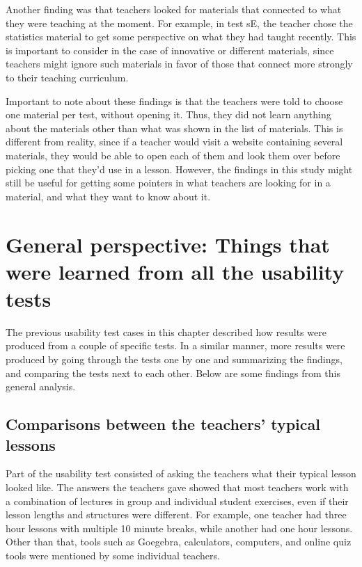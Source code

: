 Another finding was that teachers looked for materials that connected to what they were teaching at the moment. For example, in test sE, the teacher chose the statistics material to get some perspective on what they had taught recently. This is important to consider in the case of innovative or different materials, since teachers might ignore such materials in favor of those that connect more strongly to their teaching curriculum.

Important to note about these findings is that the teachers were told to choose one material per test, without opening it. Thus, they did not learn anything about the materials other than what was shown in the list of materials. This is different from reality, since if a teacher would visit a website containing several materials, they would be able to open each of them and look them over before picking one that they'd use in a lesson. However, the findings in this study might still be useful for getting some pointers in what teachers are looking for in a material, and what they want to know about it.

\section{General perspective: Things that were learned from all the usability tests}
The previous usability test cases in this chapter described how results were produced from a couple of specific tests. In a similar manner, more results were produced by going through the tests one by one and summarizing the findings, and comparing the tests next to each other. Below are some findings from this general analysis.

\subsection{Comparisons between the teachers' typical lessons}
Part of the usability test consisted of asking the teachers what their typical lesson looked like. The answers the teachers gave showed that most teachers work with a combination of lectures in group and individual student exercises, even if their lesson lengths and structures were different. For example, one teacher had three hour lessons with multiple 10 minute breaks, while another had one hour lessons. Other than that, tools such as Goegebra, calculators, computers, and online quiz tools were mentioned by some individual teachers.

